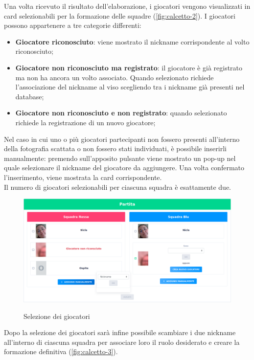 		\noindent Una volta ricevuto il risultato dell'elaborazione, i giocatori vengono visualizzati in card selezionabili per la formazione delle squadre (\autoref{fig:calcetto-2}). I giocatori possono appartenere a tre categorie differenti:
		\begin{itemize}
			\item \textbf{Giocatore riconosciuto}: viene mostrato il nickname corrispondente al volto riconosciuto;
			\item \textbf{Giocatore non riconosciuto ma registrato}: il giocatore è già registrato ma non ha ancora un volto associato. Quando selezionato richiede l'associazione del nickname al viso scegliendo tra i nickname già presenti nel database;  
			\item\textbf{Giocatore non riconosciuto e non registrato}: quando selezionato richiede la registrazione di un nuovo giocatore; 
		\end{itemize}
	
		\noindent Nel caso in cui uno o più giocatori partecipanti non fossero presenti all'interno della fotografia scattata o non fossero stati individuati, è possibile inserirli manualmente: premendo sull'apposito pulsante viene mostrato un pop-up nel quale selezionare il nickname del giocatore da aggiungere. Una volta confermato l'inserimento, viene mostrata la card corrispondente. \\
		Il numero di giocatori selezionabili per ciascuna squadra è esattamente due. 
		
		\begin{figure}[H]
			\centering
			\includegraphics[width=\textwidth]{immagini/calcetto-2.png} \\
			\caption{\label{fig:calcetto-2} Selezione dei giocatori}
		\end{figure}
		
		\noindent Dopo la selezione dei giocatori sarà infine possibile scambiare i due nickname all'interno di ciascuna squadra per associare loro il ruolo desiderato e creare la formazione definitiva (\autoref{fig:calcetto-3}).
			
